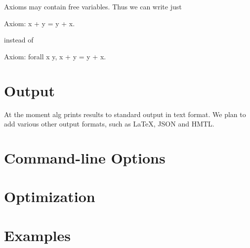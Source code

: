 \documentclass{report}
\begin{document}
Axioms may contain free variables. Thus we can write just
%
\begin{alg}
Axiom: x + y = y + x.
\end{alg}
%
instead of
\begin{alg}
Axiom: forall x y, x + y = y + x.
\end{alg}
%

\chapter{Output}
\label{sec:output-files}

At the moment alg prints results to standard output in text format. We
plan to add various other output formats, such as {\LaTeX}, JSON and HMTL.

\chapter{Command-line Options}
\label{sec:command-line-options}

\chapter{Optimization}
\label{sec:optimization}

\chapter{Examples}
\label{sec:examples}
\end{document}
